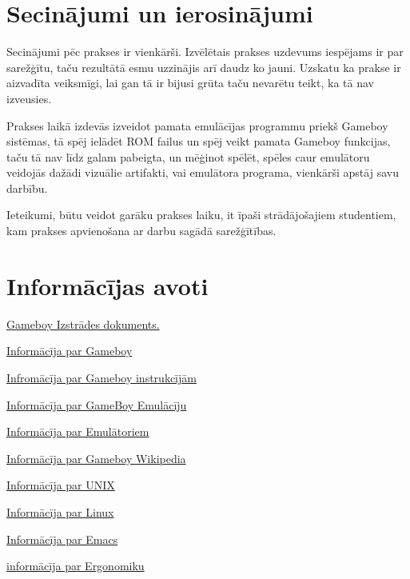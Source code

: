\documentclass[12pt]{article}
\begin{document}
	\section{Secinājumi un ierosinājumi}
	Secinājumi pēc prakses ir vienkārši. Izvēlētais prakses uzdevums iespējams ir par sarežģītu, taču rezultātā esmu uzzinājis arī daudz ko jauni. Uzskatu ka prakse ir aizvadīta veiksmīgi, lai gan tā ir bijusi grūta taču nevarētu teikt, ka tā nav izveusies.
	
	Prakses laikā izdevās izveidot pamata emulācījas programmu priekš Gameboy sistēmas, tā spēj ielādēt ROM failus un spēj veikt pamata Gameboy funkcijas, taču tā nav līdz galam pabeigta, un mēģinot spēlēt, spēles caur emulātoru veidojās dažādi vizuālie artifakti, vai emulātora programa, vienkārši apstāj savu darbību.
	
	Ieteikumi, būtu veidot garāku prakses laiku, it īpaši strādājošajiem studentiem, kam prakses apvienošana ar darbu sagādā sarežģītības.
	
	\pagebreak
	\section{Informācījas avoti}
	
	\href{https://gbdev.io/pandocs/About.html}{Gameboy Izstrādes dokuments.}
	
	\href{https://www.copetti.org/writings/consoles/game-boy/}{Informācīja par Gameboy}
	
	\href{https://www.pastraiser.com/cpu/gameboy/gameboy_opcodes.html}{Infromācīja par Gameboy instrukcījām}
	
	\href{https://emulation.gametechwiki.com/index.php/Game_Boy/Game_Boy_Color_emulators}{Informācīja par GameBoy Emulācīju}
	
	\href{https://en.wikipedia.org/wiki/Emulator}{Informācīja par Emulātoriem}
	
	\href{https://en.wikipedia.org/wiki/Game_Boy}{Informācīja par Gameboy Wikipedia}
	
	\href{https://en.wikipedia.org/wiki/Unix}{Informācīja par UNIX}
	
	\href{https://en.wikipedia.org/wiki/Linux}{Informācīja par Linux}
	
	\href{https://en.wikipedia.org/wiki/Emacs}{Informācīja par Emacs}
	
	\href{https://www.vdi.gov.lv/sites/vdi/files/media_file/2_2_12_ergonomika_un_ergonomiskie_darba_vides_riska_faktori.pdf}{informācīja par Ergonomiku}
	
\end{document}
